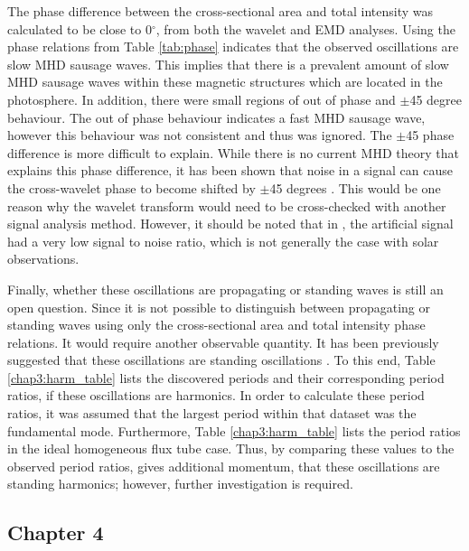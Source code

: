     The phase difference between the cross-sectional area and total intensity was calculated to be close to 0$^\circ$, from both the wavelet and EMD analyses.
    Using the phase relations from Table \ref{tab:phase} indicates that the observed oscillations are slow MHD sausage waves. 
    This implies that there is a prevalent amount of slow MHD sausage waves within these magnetic structures which are located in the photosphere.
    In addition, there were small regions of out of phase and $\pm$45 degree behaviour.
    The out of phase behaviour indicates a fast MHD sausage wave, however this behaviour was not consistent and thus was ignored. 
    The $\pm$45 phase difference is more difficult to explain.
    While there is no current MHD theory that explains this phase difference, it has been shown that noise in a signal can cause the cross-wavelet phase to become shifted by $\pm$45 degrees \citep{2015A&A...579A..73M}.
    This would be one reason why the wavelet transform would need to be cross-checked with another signal analysis method.
    However, it should be noted that in \cite{2015A&A...579A..73M}, the artificial signal had a very low signal to noise ratio, which is not generally the case with solar observations. 
    
    Finally, whether these oscillations are propagating or standing waves is still an open question. 
    Since it is not possible to distinguish between propagating or standing waves using only the cross-sectional area and total intensity phase relations.
    It would require another observable quantity.
    It has been previously suggested that these oscillations are standing oscillations \citep{morton2011}.
    To this end, Table \ref{chap3:harm_table} lists the discovered periods and their corresponding period ratios, if these oscillations are harmonics.
    In order to calculate these period ratios, it was assumed that the largest period within that dataset was the fundamental mode. 
    Furthermore, Table \ref{chap3:harm_table} lists the period ratios in the ideal homogeneous flux tube case.       
    Thus, by comparing these values to the observed period ratios, gives additional momentum, that these oscillations are standing harmonics; however, further investigation is required.
    
    \subsection{Chapter 4}
    	
